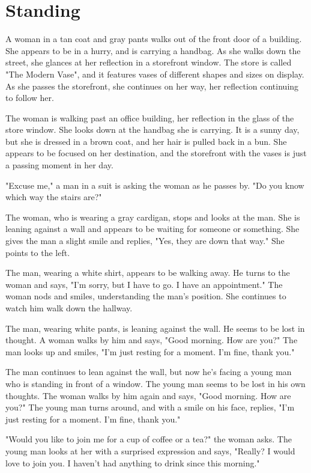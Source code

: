 \documentclass[smalldemyvopaper,11pt,twoside,onecolumn,openright,extrafontsizes]{memoir}
\begin{document}
\chapter{Standing}
A woman in a tan coat and gray pants walks out of the front door of a building. She appears to be in a hurry, and is carrying a handbag. As she walks down the street, she glances at her reflection in a storefront window. The store is called "The Modern Vase", and it features vases of different shapes and sizes on display. As she passes the storefront, she continues on her way, her reflection continuing to follow her.\par
The woman is walking past an office building, her reflection in the glass of the store window. She looks down at the handbag she is carrying. It is a sunny day, but she is dressed in a brown coat, and her hair is pulled back in a bun. She appears to be focused on her destination, and the storefront with the vases is just a passing moment in her day.\par
"Excuse me," a man in a suit is asking the woman as he passes by. "Do you know which way the stairs are?"\par
The woman, who is wearing a gray cardigan, stops and looks at the man. She is leaning against a wall and appears to be waiting for someone or something. She gives the man a slight smile and replies, "Yes, they are down that way." She points to the left.\par
The man, wearing a white shirt, appears to be walking away. He turns to the woman and says, "I'm sorry, but I have to go. I have an appointment." The woman nods and smiles, understanding the man's position. She continues to watch him walk down the hallway.\par
The man, wearing white pants, is leaning against the wall. He seems to be lost in thought. A woman walks by him and says, "Good morning. How are you?" The man looks up and smiles, "I'm just resting for a moment. I'm fine, thank you."\par
The man continues to lean against the wall, but now he's facing a young man who is standing in front of a window. The young man seems to be lost in his own thoughts. The woman walks by him again and says, "Good morning. How are you?" The young man turns around, and with a smile on his face, replies, "I'm just resting for a moment. I'm fine, thank you."\par
"Would you like to join me for a cup of coffee or a tea?" the woman asks. The young man looks at her with a surprised expression and says, "Really? I would love to join you. I haven't had anything to drink since this morning."\par
\end{document}
